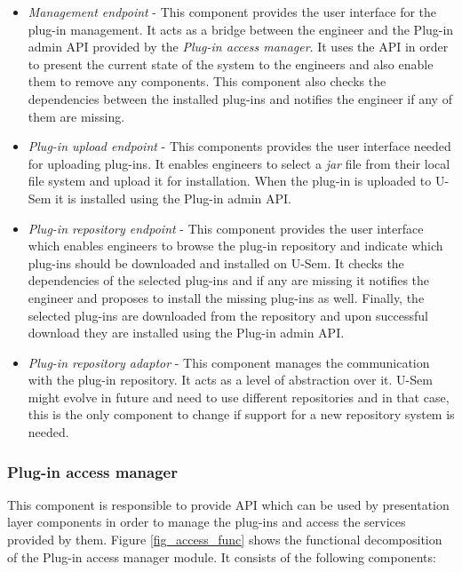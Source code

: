 \begin{itemize}

\item \textit{Management endpoint} - This component provides the user interface for the plug-in management. It acts as a bridge between the engineer and the Plug-in admin API provided by the \textit{Plug-in access manager}. It uses the API in order to present the current state of the system to the engineers and also enable them to remove any components. This component also checks the dependencies between the installed plug-ins and notifies the engineer if any of them are missing.

\item \textit{Plug-in upload endpoint} - This components provides the user interface needed for uploading plug-ins. It enables engineers to select a \textit{jar} file from their local file system and upload it for installation. When the plug-in is uploaded to U-Sem it is installed using the Plug-in admin API.

\item \textit{Plug-in repository endpoint} - This component provides the user interface which enables engineers to browse the plug-in repository and indicate which plug-ins should be downloaded and installed on U-Sem. It checks the dependencies of the selected plug-ins and if any are missing it notifies the engineer and proposes to install the missing plug-ins as well. Finally, the selected plug-ins are downloaded from the repository and upon successful download they are installed using the Plug-in admin API.

\item \textit{Plug-in repository adaptor} - This component manages  the communication with the plug-in repository. It acts as a level of abstraction over it. U-Sem might evolve in future and need to use different repositories and in that case, this is the only component to change if support for a new repository system is needed. 

\end{itemize}


\subsubsection{Plug-in access manager}

This component is responsible to provide API which can be used by presentation layer components in order to manage the plug-ins and access the services provided by them. Figure \ref{fig_access_func} shows the functional decomposition of the Plug-in access manager module. It consists of the following components:


